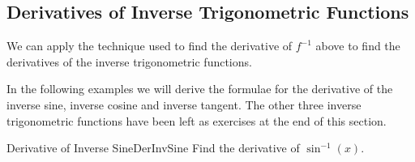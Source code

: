 \subsection{Derivatives of Inverse Trigonometric Functions}

We can apply the technique used to find the derivative of $f^{-1}$ above to find the derivatives of the inverse trigonometric functions.

In the following examples we will derive the formulae for the derivative of the inverse sine, inverse cosine and inverse tangent. The other three inverse trigonometric functions have been left as exercises at the end of this section.

\begin{example}{Derivative of Inverse Sine}{DerInvSine}
Find the derivative of $\sin^{-1}(x)$.
\end{example}
